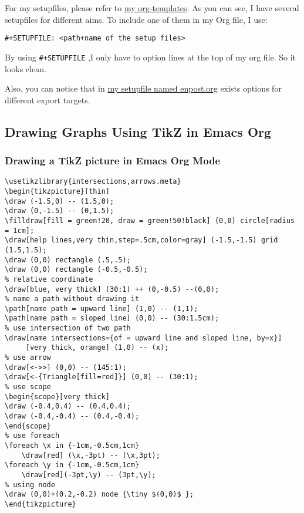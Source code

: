 For my setupfiles, please refer to \href{https://github.com/msteamc/.spacemacs.d/tree/master/org-templates}{my org-templates}. As you can see, I have
several setupfiles for different aims. To include one of them in my Org file, I
use:

\texttt{\#+SETUPFILE: <path+name of the setup files>}

By using \texttt{\#+SETUPFILE} ,I only have to option lines at the top of my org file.
So it looks clean.

Also, you can notice that in \href{https://github.com/msteamc/.spacemacs.d/blob/master/org-templates/enpost.org}{my setupfile named enpost.org} exists options for
different export targets.

\subsection{Drawing Graphs Using TikZ in Emacs Org}
\label{sec:org5bc49d6}



\subsubsection{Drawing a TikZ picture in Emacs Org Mode}
\label{sec:org8506b3a}


\begin{lstlisting}
\usetikzlibrary{intersections,arrows.meta}
\begin{tikzpicture}[thin]
\draw (-1.5,0) -- (1.5,0);
\draw (0,-1.5) -- (0,1.5);
\filldraw[fill = green!20, draw = green!50!black] (0,0) circle[radius = 1cm];
\draw[help lines,very thin,step=.5cm,color=gray] (-1.5,-1.5) grid (1.5,1.5);
\draw (0,0) rectangle (.5,.5);
\draw (0,0) rectangle (-0.5,-0.5);
% relative coordinate
\draw[blue, very thick] (30:1) ++ (0,-0.5) --(0,0);
% name a path without drawing it
\path[name path = upward line] (1,0) -- (1,1);
\path[name path = sloped line] (0,0) -- (30:1.5cm);
% use intersection of two path
\draw[name intersections={of = upward line and sloped line, by=x}]
     [very thick, orange] (1,0) -- (x);
% use arrow
\draw[<->>] (0,0) -- (145:1);
\draw[<-{Triangle[fill=red]}] (0,0) -- (30:1);
% use scope
\begin{scope}[very thick]
\draw (-0.4,0.4) -- (0.4,0.4);
\draw (-0.4,-0.4) -- (0.4,-0.4);
\end{scope}
% use foreach
\foreach \x in {-1cm,-0.5cm,1cm}
    \draw[red] (\x,-3pt) -- (\x,3pt);
\foreach \y in {-1cm,-0.5cm,1cm}
    \draw[red](-3pt,\y) -- (3pt,\y);
% using node
\draw (0,0)+(0.2,-0.2) node {\tiny $(0,0)$ };
\end{tikzpicture}
\end{lstlisting}


